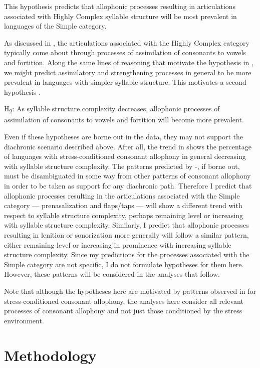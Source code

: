 This hypothesis predicts that allophonic processes resulting in articulations associated with Highly Complex syllable structure will be most prevalent in languages of the Simple category.

  As discussed in , the articulations associated with the Highly Complex category typically come about through processes of assimilation of consonants to vowels and fortition. Along the same lines of reasoning that motivate the hypothesis in , we might predict assimilatory and strengthening processes in general to be more prevalent in languages with simpler syllable structure. This motivates a second hypothesis .

\ea\label{ex:7.2}
  H\textsubscript{2}: As syllable structure complexity decreases, allophonic processes of assimilation of consonants to vowels and fortition will become more prevalent.
\z

  Even if these hypotheses are borne out in the data, they may not support the diachronic scenario described above. After all, the trend in  shows the percentage of languages with stress-conditioned consonant allophony in general decreasing with syllable structure complexity. The patterns predicted by -, if borne out, must be disambiguated in some way from other patterns of consonant allophony in order to be taken as support for any diachronic path. Therefore I predict that allophonic processes resulting in the articulations associated with the Simple category — prenasalization and flaps/taps — will show a different trend with respect to syllable structure complexity, perhaps remaining level or increasing with syllable structure complexity. Similarly, I predict that allophonic processes resulting in lenition or sonorization more generally will follow a similar pattern, either remaining level or increasing in prominence with increasing syllable structure complexity. Since my predictions for the processes associated with the Simple category are not specific, I do not formulate hypotheses for them here. However, these patterns will be considered in the analyses that follow.

  Note that although the hypotheses here are motivated by patterns observed in  for stress-conditioned consonant allophony, the analyses here consider all relevant processes of consonant allophony and not just those conditioned by the stress environment.

\section{Methodology}\label{sec:7.2}

